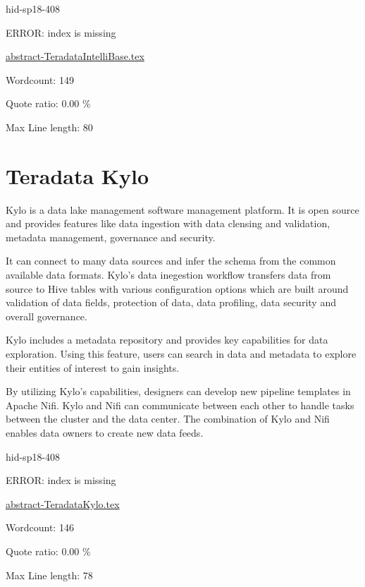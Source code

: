 \begin{IU}

hid-sp18-408

ERROR: index is missing

\href{https://github.com/cloudmesh-community/hid-sp18-408/blob/master//technology/abstract-TeradataIntelliBase.tex}{abstract-TeradataIntelliBase.tex}

 

Wordcount: 149


Quote ratio: 0.00 \%
 
Max Line length: 80
\end{IU}

\section{Teradata Kylo}

Kylo is a data lake management software management platform. It is open source
and provides features like data ingestion with data clensing and validation, 
metadata management, governance and security. 

It can connect to many data sources and infer the schema from the common
available data formats. Kylo's data inegestion workflow transfers
data from source to Hive tables with various configuration options
which are built around validation of data fields, protection of data,
data profiling, data security and overall governance.

Kylo includes a metadata repository and provides key capabilities for data 
exploration. Using this feature, users can search in data and metadata
to explore their entities of interest to gain insights. 


By utilizing Kylo's capabilities, designers can develop new
pipeline templates in Apache Nifi. Kylo and Nifi can communicate between 
each other to handle tasks between the cluster and the data center.
The combination of Kylo and Nifi enables data owners to create new
data feeds\cite{hid-sp18-408-TeradataKylo}.



\begin{IU}

hid-sp18-408

ERROR: index is missing

\href{https://github.com/cloudmesh-community/hid-sp18-408/blob/master//technology/abstract-TeradataKylo.tex}{abstract-TeradataKylo.tex}

 

Wordcount: 146


Quote ratio: 0.00 \%
 
Max Line length: 78
\end{IU}

